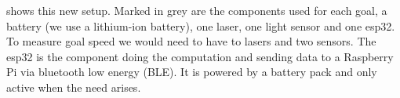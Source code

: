  shows this new setup. Marked in grey are the components used for each goal, a battery (we use a lithium-ion battery), one laser, one light sensor and one esp32. To measure goal speed we would need to have to lasers and two sensors. The esp32 is the component doing the computation and sending data to a Raspberry Pi via bluetooth low energy (BLE). It is powered by a battery pack and only active when the need arises.\\


